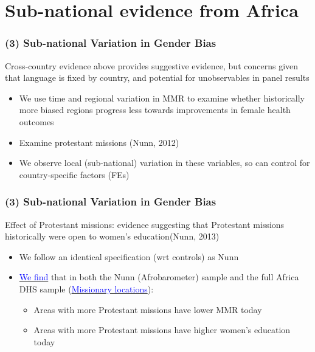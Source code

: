 \documentclass[10pt,letterpaper,subeqn]{beamer}
\begin{document}
\section{Sub-national evidence from Africa}


\begin{frame}
\frametitle{(3) Sub-national Variation in Gender Bias}
Cross-country evidence above provides suggestive evidence, but concerns given
that language is fixed by country, and potential for unobservables in panel 
results
\vspace{5mm}
\begin{itemize}
\setlength{\itemsep}{20pt}
  \item We use time and regional variation in MMR to examine whether historically
        more biased regions progress less towards improvements in female health
        outcomes
  \item Examine protestant missions (Nunn, 2012)
  \item We observe local (sub-national) variation in these variables, so can
        control for country-specific factors (FEs)
\end{itemize}
\end{frame}



\begin{frame}[label=missions]
\frametitle{(3) Sub-national Variation in Gender Bias}
Effect of Protestant missions: evidence suggesting that 
Protestant missions historically were open to women's education(Nunn, 2013) %
\vspace{2mm}
\begin{itemize}
\setlength{\itemsep}{15pt}
\item We follow an identical specification (wrt controls) as Nunn
\item \hyperlink{MissionsTab}{\textcolor{blue}{We find}} that in both the 
      Nunn (Afrobarometer) sample and the full Africa DHS sample (\hyperlink{MissionsMap}{\textcolor{blue}{Missionary locations}}):
\begin{itemize}
\item Areas with more Protestant missions have lower MMR today
\item Areas with more Protestant missions have higher women's education today
\end{itemize}
\end{itemize}
\end{frame}
\end{document}
